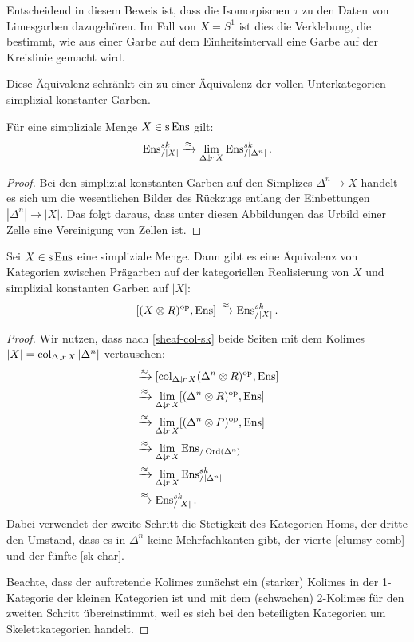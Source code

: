 \begin{bem}
  Entscheidend in diesem Beweis ist, dass die Isomorpismen $\tau$ zu
  den Daten von Limesgarben dazugehören. Im Fall von $X = S^1$ ist
  dies die Verklebung, die bestimmt, wie aus einer Garbe auf dem
  Einheitsintervall eine Garbe auf der Kreislinie gemacht wird.
\end{bem}
Diese Äquivalenz schränkt ein zu einer Äquivalenz der vollen
Unterkategorien simplizial konstanter Garben.
\begin{prop} \label{sheaf-col-sk}
 Für eine simpliziale Menge $X \in \operatorname{s}\operatorname{Ens}$ gilt:
  \[ \operatorname{Ens}_{/|X|}^{sk} \xrightarrow{\approx} \lim_{\Delta \downarrow \! {\scriptstyle r} \, X} \operatorname{Ens}_{/|\Delta^n|}^{sk}. \]
\end{prop}
\begin{proof}
  Bei den simplizial konstanten Garben auf den Simplizes $\Delta^n \to
  X$ handelt es sich um die wesentlichen Bilder des Rückzugs entlang
  der Einbettungen $|\Delta^n| \to |X|$. Das folgt daraus, dass unter
  diesen Abbildungen das Urbild einer Zelle eine Vereinigung von
  Zellen ist.
\end{proof}
\begin{theorem}
  Sei $X \in \operatorname{s}\operatorname{Ens}$ eine simpliziale Menge. Dann gibt es eine
  Äquivalenz von Kategorien zwischen Prägarben auf der kategoriellen
  Realisierung von $X$ und simplizial konstanten Garben auf $|X|$:
  \[ [(X \otimes R)^\mathrm{op}, \operatorname{Ens}] \xrightarrow{\approx} \operatorname{Ens}^{sk}_{/|X|} .\]
\end{theorem}
\begin{proof}
  Wir nutzen, dass nach \ref{sheaf-col-sk} beide Seiten mit dem
  Kolimes $|X| = \operatorname{col}_{\Delta \downarrow \! {\scriptstyle r} \, X} |\Delta^n|$
  vertauschen:
  \begin{align*}
    [(X \otimes R)\op, \Ens]
    &\qiso [\col_{\slicecat{\Delta}{r}{X}} (\Delta^n \otimes R)\op, \Ens] \\
    &\qiso \lim_{\slicecat{\Delta}{r}{X}} [(\Delta^n \otimes R)\op, \Ens] \\
    &\qiso \lim_{\slicecat{\Delta}{r}{X}} [(\Delta^n \otimes P)\op, \Ens] \\
    &\qiso \lim_{\slicecat{\Delta}{r}{X}} \Ens_{/\Ord(\Delta^n)} \\
    &\qiso \lim_{\slicecat{\Delta}{r}{X}} \Ens_{/|\Delta^n|}^{sk} \\
    &\qiso \Ens_{/|X|}^{sk}.    
  \end{align*}
  Dabei verwendet der zweite Schritt die Stetigkeit des
  Kategorien-Homs, der dritte den Umstand, dass es in $\Delta^n$ keine
  Mehrfachkanten gibt, der vierte \ref{clumsy-comb} und der fünfte
  \ref{sk-char}.

  Beachte, dass der auftretende Kolimes zunächst ein (starker) Kolimes
  in der 1-Kategorie der kleinen Kategorien ist und mit dem
  (schwachen) 2-Kolimes für den zweiten Schritt übereinstimmt, weil es
  sich bei den beteiligten Kategorien um Skelettkategorien handelt.
\end{proof}
